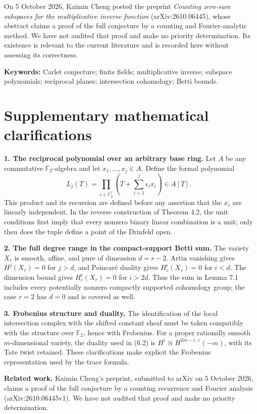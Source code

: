 \documentclass[11pt]{amsart}
\begin{document}
On 5 October 2026, Kaimin Cheng posted the preprint \emph{Counting zero-sum subspaces for the multiplicative inverse function} (arXiv:2610.06445), whose abstract claims a proof of the full conjecture by a counting and Fourier-analytic method. We have not audited that proof and make no priority determination. Its existence is relevant to the current literature and is recorded here without assessing its correctness.

\noindent\textbf{Keywords:} Carlet conjecture; finite fields; multiplicative inverse; subspace polynomials; reciprocal planes; intersection cohomology; Betti bounds.
\newpage
\section*{Supplementary mathematical clarifications}
\textbf{1. The reciprocal polynomial over an arbitrary base ring.} Let $A$ be any commutative $\mathbb F_2$-algebra and let $x_1,\ldots,x_j\in A$. Define the formal polynomial
\[
L_j(T)=\prod_{\epsilon\in\mathbb F_2^j}\left(T+\sum_{i=1}^j\epsilon_i x_i\right)\in A[T].
\]
This product and its recursion are defined before any assertion that the $x_i$ are linearly independent. In the reverse construction of Theorem 4.2, the unit conditions first imply that every nonzero binary linear combination is a unit; only then does the tuple define a point of the Drinfeld open.

\textbf{2. The full degree range in the compact-support Betti sum.} The variety $X_r$ is smooth, affine, and pure of dimension $d=r-2$. Artin vanishing gives $H^j(X_r)=0$ for $j>d$, and Poincar\'e duality gives $H_c^i(X_r)=0$ for $i<d$. The dimension bound gives $H_c^i(X_r)=0$ for $i>2d$. Thus the sum in Lemma 7.1 includes every potentially nonzero compactly supported cohomology group; the case $r=2$ has $d=0$ and is covered as well.

\textbf{3. Frobenius structure and duality.} The identification of the local intersection complex with the shifted constant sheaf must be taken compatibly with the structure over $\mathbb F_2$, hence with Frobenius. For a proper rationally smooth $m$-dimensional variety, the duality used in (6.2) is $H^i\cong H^{2m-i,\vee}(-m)$, with its Tate twist retained. These clarifications make explicit the Frobenius representation used by the trace formula.

\textbf{Related work.} Kaimin Cheng's preprint, submitted to arXiv on 5 October 2026, claims a proof of the full conjecture by a counting recurrence and Fourier analysis (arXiv:2610.06445v1). We have not audited that proof and make no priority determination.
\end{document}
